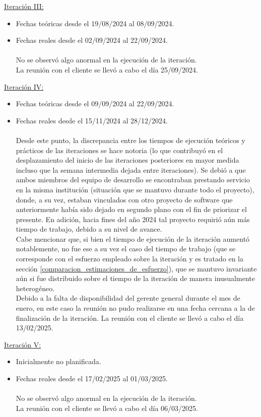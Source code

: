 \documentclass[a4paper, 12pt,twoside]{report}  %
\numberwithin{equation}{subsection} %
\begin{document}
\underline{Iteración III:}
\begin{itemize}
	\item Fechas teóricas desde el 19/08/2024 al 08/09/2024.
	\item Fechas reales desde el 02/09/2024 al 22/09/2024.\\\\
	No se observó algo anormal en la ejecución de la iteración.\\
	La reunión con el cliente se llevó a cabo el día 25/09/2024.
\end{itemize}
\underline{Iteración IV:}
\begin{itemize}
	\item Fechas teóricas desde el 09/09/2024 al 22/09/2024.
	\item Fechas reales desde el 15/11/2024 al 28/12/2024.\\\\
	Desde este punto, la discrepancia entre los tiempos de ejecución teóricos y prácticos de las iteraciones se hace notoria (lo que contribuyó en el desplazamiento del inicio de las iteraciones posteriores en mayor medida incluso que la semana intermedia dejada entre iteraciones). Se debió a que ambos miembros del equipo de desarrollo se encontraban prestando servicio en la misma institución (situación que se mantuvo durante todo el proyecto), donde, a su vez, estaban vinculados con otro proyecto de software que anteriormente había sido dejado en segundo plano con el fin de priorizar el presente. En adición, hacia fines del año 2024 tal proyecto requirió aún más tiempo de trabajo, debido a su nivel de avance.\\
	Cabe mencionar que, si bien el tiempo de ejecución de la iteración aumentó notablemente, no fue ese a su vez el caso del tiempo de trabajo (que se corresponde con el esfuerzo empleado sobre la iteración y es tratado en la sección \ref{comparacion_estimaciones_de_esfuerzo}), que se mantuvo invariante aún si fue distribuido sobre el tiempo de la iteración de manera inusualmente heterogéneo.\\
	Debido a la falta de disponibilidad del gerente general durante el mes de enero, en este caso la reunión no pudo realizarse en una fecha cercana a la de finalización de la iteración. La reunión con el cliente se llevó a cabo el día 13/02/2025.
\end{itemize}
\underline{Iteración V:}
\begin{itemize}
	\item Inicialmente no planificada.
	\item Fechas reales desde el 17/02/2025 al 01/03/2025.\\\\
	No se observó algo anormal en la ejecución de la iteración.\\
	La reunión con el cliente se llevó a cabo el día 06/03/2025.
\end{itemize}
\end{document}
